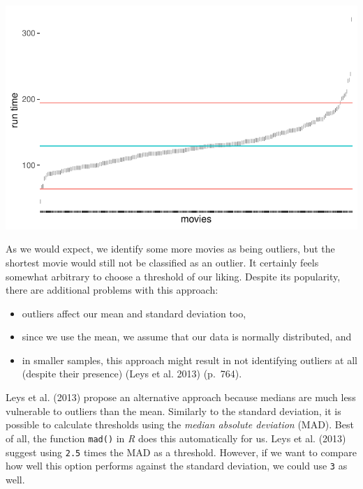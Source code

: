 \documentclass[
  letterpaper,
]{krantz}
\begin{document}
\includegraphics{09_sources_of_bias_files/figure-pdf/outlier-detection-two-sd-1.pdf}

As we would expect, we identify some more movies as being outliers, but
the shortest movie would still not be classified as an outlier. It
certainly feels somewhat arbitrary to choose a threshold of our liking.
Despite its popularity, there are additional problems with this
approach:

\begin{itemize}
\item
  outliers affect our mean and standard deviation too,
\item
  since we use the mean, we assume that our data is normally
  distributed, and
\item
  in smaller samples, this approach might result in not identifying
  outliers at all (despite their presence) (Leys et al. 2013) (p.~764).
\end{itemize}

Leys et al. (2013) propose an alternative approach because medians are
much less vulnerable to outliers than the mean. Similarly to the
standard deviation, it is possible to calculate thresholds using the
\emph{median absolute deviation} (MAD). Best of all, the function
\texttt{mad()} in \emph{R} does this automatically for us. Leys et al.
(2013) suggest using \texttt{2.5} times the MAD as a threshold. However,
if we want to compare how well this option performs against the standard
deviation, we could use \texttt{3} as well.
\end{document}
